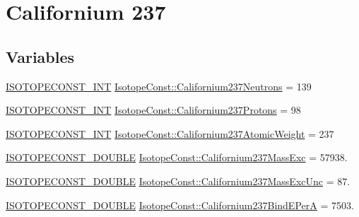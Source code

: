 \hypertarget{group___isotope_const-_californium-_cf237}{}\section{Californium 237}
\label{group___isotope_const-_californium-_cf237}
\subsection*{Variables}
\begin{DoxyCompactItemize}
\item 
\mbox{\hyperlink{group___isotope_const-_macros_ga5f18360b3e99483a35c32d789e62621c}{I\+S\+O\+T\+O\+P\+E\+C\+O\+N\+S\+T\+\_\+\+I\+NT}} \mbox{\hyperlink{group___isotope_const-_californium-_cf237_ga589ccf17d25c791d905fd03cd65fc96f}{Isotope\+Const\+::\+Californium237\+Neutrons}} = 139
\item 
\mbox{\hyperlink{group___isotope_const-_macros_ga5f18360b3e99483a35c32d789e62621c}{I\+S\+O\+T\+O\+P\+E\+C\+O\+N\+S\+T\+\_\+\+I\+NT}} \mbox{\hyperlink{group___isotope_const-_californium-_cf237_gafd4078f360a21f8406e03a3c21adbc9d}{Isotope\+Const\+::\+Californium237\+Protons}} = 98
\item 
\mbox{\hyperlink{group___isotope_const-_macros_ga5f18360b3e99483a35c32d789e62621c}{I\+S\+O\+T\+O\+P\+E\+C\+O\+N\+S\+T\+\_\+\+I\+NT}} \mbox{\hyperlink{group___isotope_const-_californium-_cf237_gadfb41fc8fc7691fd99783629ab7826ae}{Isotope\+Const\+::\+Californium237\+Atomic\+Weight}} = 237
\item 
\mbox{\hyperlink{group___isotope_const-_macros_ga8f45a7272ce02c0b4c65c44636ed719a}{I\+S\+O\+T\+O\+P\+E\+C\+O\+N\+S\+T\+\_\+\+D\+O\+U\+B\+LE}} \mbox{\hyperlink{group___isotope_const-_californium-_cf237_ga14f2e54787182329587b56990316d894}{Isotope\+Const\+::\+Californium237\+Mass\+Exc}} = 57938.
\item 
\mbox{\hyperlink{group___isotope_const-_macros_ga8f45a7272ce02c0b4c65c44636ed719a}{I\+S\+O\+T\+O\+P\+E\+C\+O\+N\+S\+T\+\_\+\+D\+O\+U\+B\+LE}} \mbox{\hyperlink{group___isotope_const-_californium-_cf237_gadb0ea9d051037dd8f069ad0186697f26}{Isotope\+Const\+::\+Californium237\+Mass\+Exc\+Unc}} = 87.
\item 
\mbox{\hyperlink{group___isotope_const-_macros_ga8f45a7272ce02c0b4c65c44636ed719a}{I\+S\+O\+T\+O\+P\+E\+C\+O\+N\+S\+T\+\_\+\+D\+O\+U\+B\+LE}} \mbox{\hyperlink{group___isotope_const-_californium-_cf237_ga32c21d4fefa0ae2bebfe7cb2ca42b826}{Isotope\+Const\+::\+Californium237\+Bind\+E\+PerA}} = 7503.

\end{DoxyCompactItemize}
